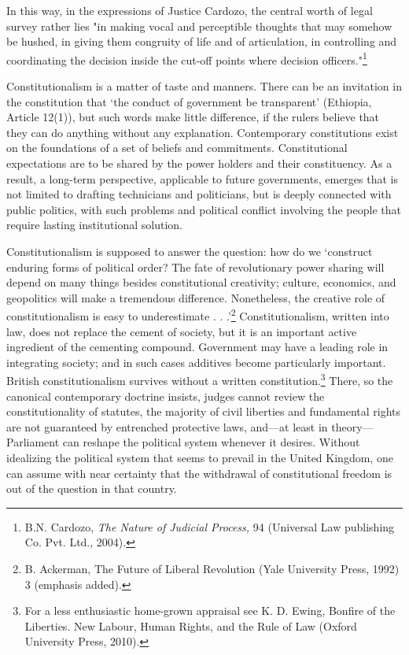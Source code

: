 \begin{multicols}{2}
\vspace{-.1cm}

\noi
In this way, in the expressions of Justice Cardozo, the central worth of legal survey rather lies
"in making vocal and perceptible thoughts that may somehow be hushed, in giving them
congruity of life and of articulation, in controlling and coordinating the decision inside the
cut-off points where decision officers."\footnote{B.N. Cardozo, \textit{The Nature of Judicial Process,} 94 (Universal Law publishing Co. Pvt. Ltd., 2004).}

\vspace{-.1cm}


\vspace{-.1cm}

\noi
Constitutionalism is a matter of taste and manners. There can be an invitation in the
constitution that ‘the conduct of government be transparent’ (Ethiopia, Article 12(1)), but
such words make little difference, if the rulers believe that they can do anything without any
explanation. Contemporary constitutions exist on the foundations of a set of beliefs and
commitments. Constitutional expectations are to be shared by the power holders and their
constituency. As a result, a long-term perspective, applicable to future governments, emerges
that is not limited to drafting technicians and politicians, but is deeply connected with public
politics, with such problems and political conflict involving the people that require lasting
institutional solution.

\vspace{-.1cm}

\noi
Constitutionalism is supposed to answer the question: how do we ‘construct enduring forms
of political order? The fate of revolutionary power sharing will depend on many things
besides constitutional creativity; culture, economics, and geopolitics will make a tremendous
difference. Nonetheless, the creative role of constitutionalism is easy to underestimate . . .’\footnote{B. Ackerman, The Future of Liberal Revolution (Yale University Press, 1992) 3 (emphasis added).}
Constitutionalism, written into law, does not replace the cement of society, but it is an
important active ingredient of the cementing compound. Government may have a leading role
in integrating society; and in such cases additives become particularly important.
British constitutionalism survives without a written constitution.\footnote{For a less enthusiastic home-grown appraisal see K. D. Ewing, Bonfire of the Liberties. New Labour, Human Rights, and the Rule of Law (Oxford University Press, 2010).} There, so the canonical contemporary doctrine insists, judges cannot review the constitutionality of statutes, the majority of civil liberties and fundamental rights are not guaranteed by entrenched protective laws, and—at least in theory—Parliament can reshape the political system whenever it
desires. Without idealizing the political system that seems to prevail in the United Kingdom,
one can assume with near certainty that the withdrawal of constitutional freedom is out of the
question in that country.


\end{multicols}
